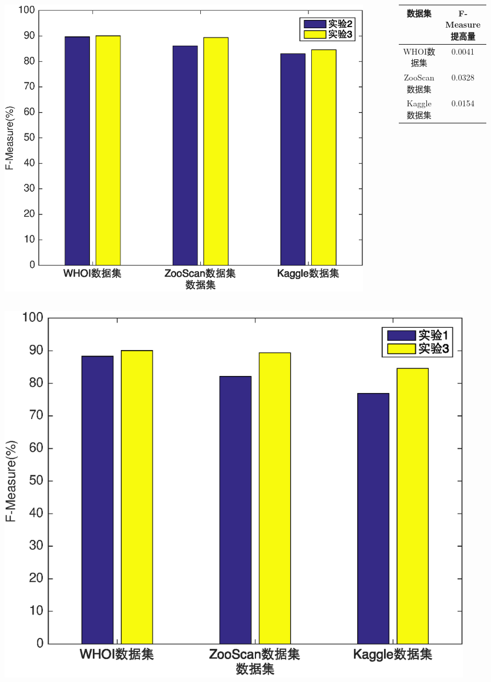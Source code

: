 \documentclass[notheorems,mathserif,table,compress]{beamer}  %
\begin{document}
\begin{frame}
\begin{columns}
\begin{column}{0.5\linewidth}
\begin{figure}
\includegraphics[width=0.7\linewidth]{comp232}
\end{figure}
\end{column}

\begin{column}{0.5\linewidth}
\begin{table}
\scriptsize
  \centering
  \begin{tabular}[c]{cc}
    \toprule
    数据集 & F-Measure提高量\\
    \midrule
    WHOI数据集 & 0.0041\\
    ZooScan数据集 & 0.0328\\
    Kaggle数据集 & 0.0154\\
    \bottomrule
  \end{tabular}
\end{table}
\end{column}
\end{columns}\vspace{1ex}
\pause
\begin{columns}
\begin{column}{0.5\linewidth}
\begin{figure}
\includegraphics[width=0.7\linewidth]{comp13}
\end{figure}
\end{column}


\end{columns}
\end{frame}
\end{document}
